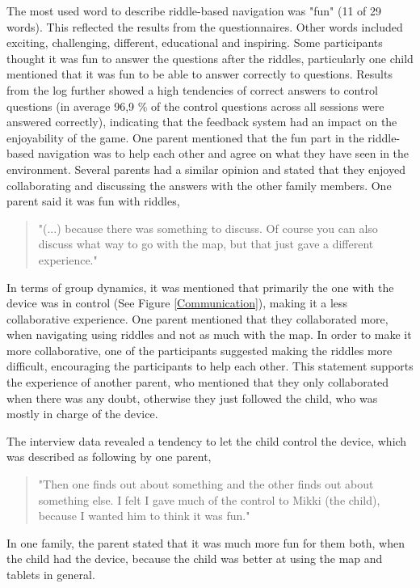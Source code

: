 The most used word to describe riddle-based navigation was "fun" (11 of 29 words). This reflected the results from the questionnaires. Other words included exciting, challenging, different, educational and inspiring. Some participants thought it was fun to answer the questions after the riddles, particularly one child mentioned that it was fun to be able to answer correctly to questions. Results from the log further showed a high tendencies of correct answers to control questions (in average 96,9 \% of the control questions across all sessions were answered correctly), indicating that the feedback system had an impact on the enjoyability of the game. One parent mentioned that the fun part in the riddle-based navigation was to help each other and agree on what they have seen in the environment. Several parents had a similar opinion and stated that they enjoyed collaborating and discussing the answers with the other family members. One parent said it was fun with riddles, 

\begin{quote}
    "(...) because there was something to discuss. Of course you can also discuss what way to go with the map, but that just gave a different experience."
\end{quote}

In terms of group dynamics, it was mentioned that primarily the one with the device was in control (See Figure \ref{Communication}), making it a less collaborative experience. One parent mentioned that they collaborated more, when navigating using riddles and not as much with the map. In order to make it more collaborative, one of the participants suggested making the riddles more difficult, encouraging the participants to help each other. This statement supports the experience of another parent, who mentioned that they only collaborated when there was any doubt, otherwise they just followed the child, who was mostly in charge of the device. 

The interview data revealed a tendency to let the child control the device, which was described as following by one parent,  

\begin{quote}
    "Then one finds out about something and the other finds out about something else. I 
felt I gave much of the control to Mikki (the child), because I wanted him to think it 
was fun."
\end{quote}
 
In one family, the parent stated that it was much more fun for them both, when the child had the device, because the child was better at using the map and tablets in general.